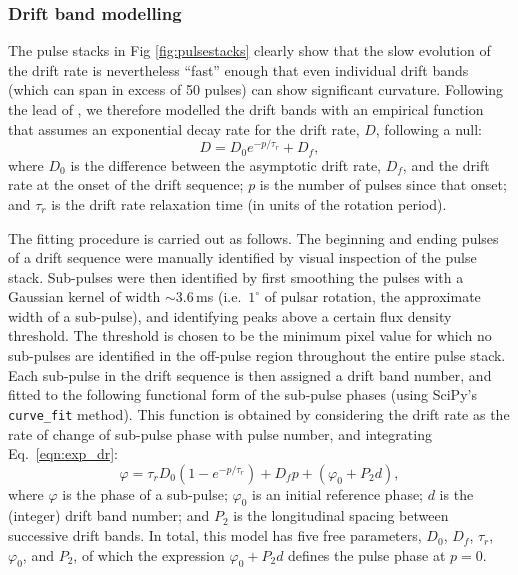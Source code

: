 \documentclass[linenumbers]{aastex631}
\begin{document}
\subsubsection{Drift band modelling}

The pulse stacks in Fig \ref{fig:pulsestacks} clearly show that the slow evolution of the drift rate is nevertheless ``fast'' enough that even individual drift bands (which can span in excess of 50 pulses) can show significant curvature.
Following the lead of \citet{Lyne1983}, we therefore modelled the drift bands with an empirical function that assumes an exponential decay rate for the drift rate, $D$, following a null:
\begin{equation}
    D = D_0 e^{-p/\tau_r} + D_f,
    \label{eqn:exp_dr}
\end{equation}
where $D_0$ is the difference between the asymptotic drift rate, $D_f$, and the drift rate at the onset of the drift sequence; $p$ is the number of pulses since that onset; and $\tau_r$ is the drift rate relaxation time (in units of the rotation period).

The fitting procedure is carried out as follows.
The beginning and ending pulses of a drift sequence were manually identified by visual inspection of the pulse stack.
Sub-pulses were then identified by first smoothing the pulses with a Gaussian kernel of width $\sim3.6\,$ms (i.e.\ $1^\circ$ of pulsar rotation, the approximate width of a sub-pulse), and identifying peaks above a certain flux density threshold.
The threshold is chosen to be the minimum pixel value for which no sub-pulses are identified in the off-pulse region throughout the entire pulse stack.
Each sub-pulse in the drift sequence is then assigned a drift band number, and fitted to the following functional form of the sub-pulse phases (using SciPy's \texttt{curve\_fit} method).
This function is obtained by considering the drift rate as the rate of change of sub-pulse phase with pulse number, and integrating Eq.~\eqref{eqn:exp_dr}:
\begin{equation}
    \varphi = \tau_r D_0 \left(1 - e^{-p/\tau_r}\right) + D_f p + (\varphi_0 + P_2 d),
    \label{eqn:exp_phase}
\end{equation}
where $\varphi$ is the phase of a sub-pulse; $\varphi_0$ is an initial reference phase; $d$ is the (integer) drift band number; and $P_2$ is the longitudinal spacing between successive drift bands.
In total, this model has five free parameters, $D_0$, $D_f$, $\tau_r$, $\varphi_0$, and $P_2$, of which the expression $\varphi_0 + P_2 d$ defines the pulse phase at $p = 0$.
\end{document}
